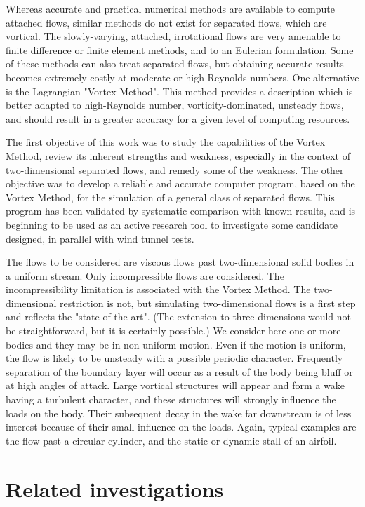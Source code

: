 Whereas accurate and practical numerical methods are available to compute attached flows, similar methods do not exist for separated flows, which are vortical.
The slowly-varying, attached, irrotational flows are very amenable to finite difference or finite element methods, and to an Eulerian formulation.
Some of these methods can also treat separated flows, but obtaining accurate results becomes extremely costly at moderate or high Reynolds numbers.
One alternative is the Lagrangian "Vortex Method".
This method provides a description which is better adapted to high-Reynolds number, vorticity-dominated, unsteady flows, and should result in a greater accuracy for a given level of computing resources.

The first objective of this work was to study the capabilities of the Vortex Method, review its inherent strengths and weakness, especially in the context of two-dimensional separated flows, and remedy some of the weakness.
The other objective was to develop a reliable and accurate computer program, based on the Vortex Method, for the simulation of a general class of separated flows.
This program has been validated by systematic comparison with known results, and is beginning to be used as an active research tool to investigate some candidate designed, in parallel with wind tunnel tests.

The flows to be considered are viscous flows past two-dimensional solid bodies in a uniform stream.
Only incompressible flows are considered.
The incompressibility limitation is associated with the Vortex Method.
The two-dimensional restriction is not, but simulating two-dimensional flows is a first step and reflects the "state of the art".
(The extension to three dimensions would not be straightforward, but it is certainly possible.)
We consider here one or more bodies and they may be in non-uniform motion.
Even if the motion is uniform, the flow is likely to be unsteady with a possible periodic character.
Frequently separation of the boundary layer will occur as a result of the body being bluff or at high angles of attack.
Large vortical structures will appear and form a wake having a turbulent character, and these structures will strongly influence the loads on the body.
Their subsequent decay in the wake far downstream is of less interest because of their small influence on the loads.
Again, typical examples are the flow past a circular cylinder, and the static or dynamic stall of an airfoil.


\section{Related investigations}

